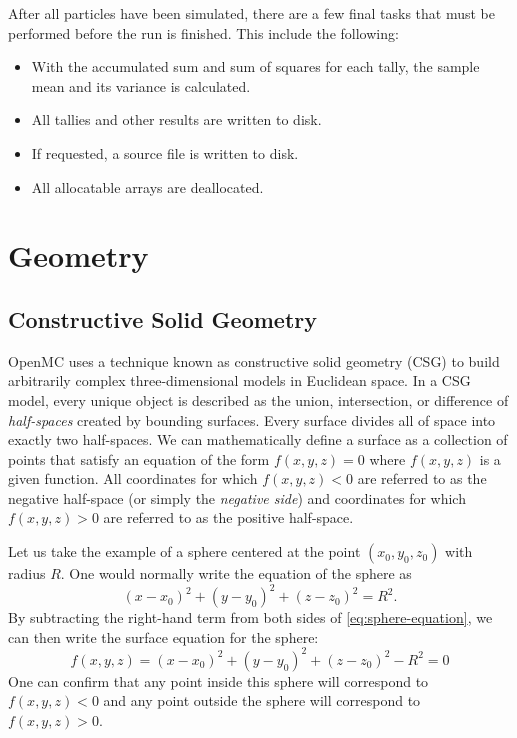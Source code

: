 After all particles have been simulated, there are a few final tasks that must
be performed before the run is finished. This include the following:
\begin{itemize}
\item With the accumulated sum and sum of squares for each tally, the sample
  mean and its variance is calculated.
\item All tallies and other results are written to disk.
\item If requested, a source file is written to disk.
\item All allocatable arrays are deallocated.
\end{itemize}

\section{Geometry}

\subsection{Constructive Solid Geometry}

OpenMC uses a technique known as constructive solid geometry (CSG) to build
arbitrarily complex three-dimensional models in Euclidean space. In a CSG model,
every unique object is described as the union, intersection, or difference of
\emph{half-spaces} created by bounding surfaces. Every surface divides all of
space into exactly two half-spaces. We can mathematically define a surface as a
collection of points that satisfy an equation of the form $f(x,y,z) = 0$ where
$f(x,y,z)$ is a given function. All coordinates for which $f(x,y,z) < 0$ are
referred to as the negative half-space (or simply the \emph{negative side}) and
coordinates for which $f(x,y,z) > 0$ are referred to as the positive half-space.

Let us take the example of a sphere centered at the point $(x_0,y_0,z_0)$
with radius $R$. One would normally write the equation of the sphere as
\begin{equation}
  \label{eq:sphere-equation}
  (x - x_0)^2 + (y - y_0)^2 + (z - z_0)^2 = R^2.
\end{equation}
By subtracting the right-hand term from both sides of
\eqref{eq:sphere-equation}, we can then write the surface equation for the
sphere:
\begin{equation}
  \label{eq:surface-equation-sphere}
  f(x,y,z) = (x - x_0)^2 + (y - y_0)^2 + (z - z_0)^2 - R^2 = 0
\end{equation}
One can confirm that any point inside this sphere will correspond to
$f(x,y,z) < 0$ and any point outside the sphere will correspond to
$f(x,y,z) > 0$.

